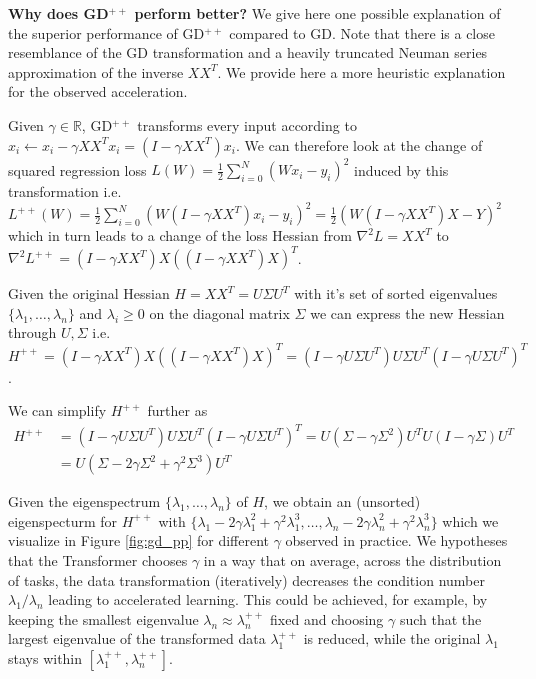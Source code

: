 \documentclass{article}
\theoremstyle{plain}
\theoremstyle{definition}
\theoremstyle{remark}
\begin{document}
\textbf{Why does GD$^{++}$ perform better?} We give here one possible explanation of the superior performance of GD$^{++}$ compared to GD. Note that there is a close resemblance of the GD transformation and a heavily truncated Neuman series approximation of the inverse $XX^T$. We provide here a more heuristic explanation for the observed acceleration. 

Given $\gamma \in \mathbb{R}$, GD$^{++}$ transforms every input according to $x_i \leftarrow x_i-\gamma XX^Tx_i = (I-\gamma XX^T)x_i$. We can therefore look at the change of squared regression loss $L(W) = \frac{1}{2}\sum_{i=0}^N (Wx_i -y_i)^2$ induced by this transformation i.e. $L^{++}(W) = \frac{1}{2}\sum_{i=0}^N (W(I-\gamma XX^T)x_i -y_i)^2 = \frac{1}{2}(W(I-\gamma XX^T)X-Y)^2$ which in turn leads to a change of the loss Hessian from $\nabla^2 L = XX^T$ to 
$\nabla^2 L^{++} = (I-\gamma XX^T)X((I-\gamma XX^T)X)^T$.

Given the original Hessian $H = XX^T = U\Sigma U^T$ with it's set of sorted eigenvalues $\{\lambda_1, \dots , \lambda_n\}$ and $\lambda_i \geq 0$ on the diagonal matrix $\Sigma$ we can express the new Hessian through $U, \Sigma$ i.e. $H^{++} = (I-\gamma XX^T)X((I-\gamma XX^T)X)^T = (I-\gamma U\Sigma U^T)U\Sigma U^T(I-\gamma U\Sigma U^T)^T$. 

We can simplify $H^{++}$ further as
\begin{align}
    H^{++} &= (I-\gamma U\Sigma U^T)U\Sigma U^T(I-\gamma U\Sigma U^T)^T = U (\Sigma - \gamma \Sigma^2) U^T U (I - \gamma \Sigma) U^T \\ &= U (\Sigma - 2 \gamma \Sigma^2 + \gamma^2 \Sigma^3) U^T
\end{align}

Given the eigenspectrum $\{\lambda_1, \dots , \lambda_n\}$ of $H$, we obtain an (unsorted) eigenspecturm for $H^{++}$ with  $\{\lambda_1 - 2\gamma \lambda_1^2 + \gamma^2 \lambda_1^3, \dots , \lambda_n - 2\gamma \lambda_n^2 + \gamma^2 \lambda_n^3\}$ which we visualize in Figure  \ref{fig:gd_pp} for different $\gamma$ observed in practice. We hypotheses that the Transformer chooses $\gamma$ in a way that on average, across the distribution of tasks, the data transformation (iteratively) decreases the condition number $\lambda_1/\lambda_n$ leading to accelerated learning. This could be achieved, for example, by keeping the smallest eigenvalue $\lambda_n \approx \lambda_n^{++}$ fixed and choosing $\gamma$ such that the largest eigenvalue of the transformed data $\lambda_1^{++}$ is reduced, while the original $\lambda_1$ stays within $[\lambda_1^{++}, \lambda_n^{++}]$.
\end{document}
